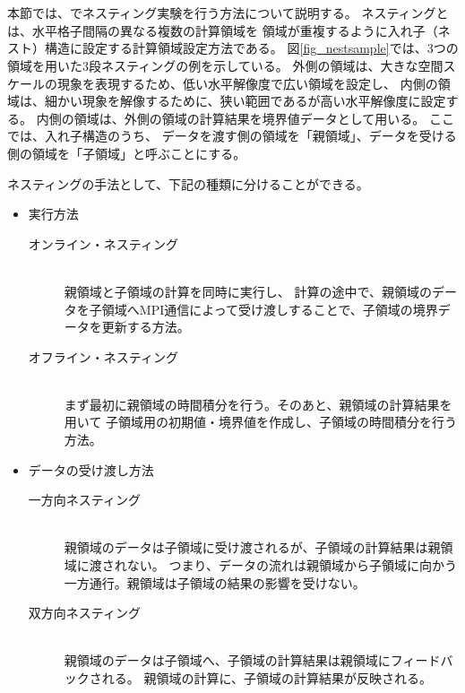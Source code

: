 \section{\SecAdvanceNesting} \label{sec:nest_exp}

本節では、\scalerm でネスティング実験を行う方法について説明する。
ネスティングとは、水平格子間隔の異なる複数の計算領域を
領域が重複するように入れ子（ネスト）構造に設定する計算領域設定方法である。
図\ref{fig_nestsample}では、3つの領域を用いた3段ネスティングの例を示している。
外側の領域は、大きな空間スケールの現象を表現するため、低い水平解像度で広い領域を設定し、
内側の領域は、細かい現象を解像するために、狭い範囲であるが高い水平解像度に設定する。
内側の領域は、外側の領域の計算結果を境界値データとして用いる。
ここでは、入れ子構造のうち、
データを渡す側の領域を「親領域」、データを受ける側の領域を「子領域」と呼ぶことにする。

ネスティングの手法として、下記の種類に分けることができる。
\begin{itemize}
\item 実行方法
\begin{description}
 \item[オンライン・ネスティング]\mbox{}\\
親領域と子領域の計算を同時に実行し、
計算の途中で、親領域のデータを子領域へMPI通信によって受け渡しすることで、子領域の境界データを更新する方法。
 \item[オフライン・ネスティング]\mbox{}\\
まず最初に親領域の時間積分を行う。そのあと、親領域の計算結果を用いて
子領域用の初期値・境界値を作成し、子領域の時間積分を行う方法。
\end{description}
\item データの受け渡し方法
\begin{description}
 \item[一方向ネスティング]\mbox{}\\
親領域のデータは子領域に受け渡されるが、子領域の計算結果は親領域に渡されない。
つまり、データの流れは親領域から子領域に向かう一方通行。親領域は子領域の結果の影響を受けない。
 \item[双方向ネスティング]\mbox{}\\
親領域のデータは子領域へ、子領域の計算結果は親領域にフィードバックされる。
親領域の計算に、子領域の計算結果が反映される。
\end{description}
\end{itemize}

